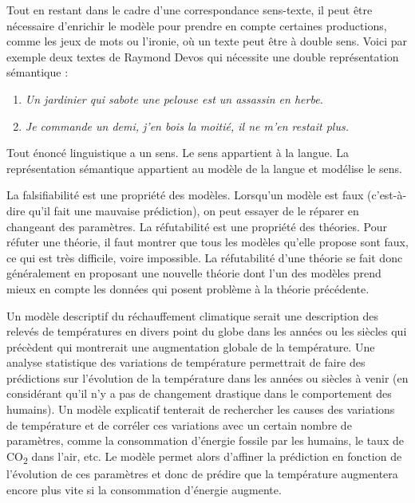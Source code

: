 {Tout en restant dans le cadre d’une correspondance sens-texte, il peut être nécessaire d’enrichir le modèle pour prendre en compte certaines productions, comme les jeux de mots ou l’ironie, où un texte peut être à double sens. Voici par exemple deux textes de Raymond Devos qui nécessite une double représentation sémantique :

\begin{enumerate}[label=(\arabic*)]
    \item \textit{Un jardinier qui sabote une pelouse est un assassin en herbe.}

    \item \textit{Je commande un demi, j'en bois la moitié, il ne m'en restait plus.}
    \end{enumerate}


    
     Tout énoncé linguistique a un sens. Le sens appartient à la langue. La représentation sémantique appartient au modèle de la langue et modélise le sens.

     La falsifiabilité est une propriété des modèles. Lorsqu’un modèle est faux (c’est-à-dire qu’il fait une mauvaise prédiction), on peut essayer de le réparer en changeant des paramètres. La réfutabilité est une propriété des théories. Pour réfuter une théorie, il faut montrer que tous les modèles qu’elle propose sont faux, ce qui est très difficile, voire impossible. La réfutabilité d’une théorie se fait donc généralement en proposant une nouvelle théorie dont l’un des modèles prend mieux en compte les données qui posent problème à la théorie précédente.

     Un modèle descriptif du réchauffement climatique serait une description des relevés de températures en divers point du globe dans les années ou les siècles qui précèdent qui montrerait une augmentation globale de la température. Une analyse statistique des variations de température permettrait de faire des prédictions sur l’évolution de la température dans les années ou siècles à venir (en considérant qu'il n'y a pas de changement drastique dans le comportement des humains). Un modèle explicatif tenterait de rechercher les causes des variations de température et de corréler ces variations avec un certain nombre de paramètres, comme la consommation d’énergie fossile par les humains, le taux de CO\textsubscript{2} dans l'air, etc. Le modèle permet alors d’affiner la prédiction en fonction de l’évolution de ces paramètres et donc de prédire que la température augmentera encore plus vite si la consommation d’énergie augmente.

}
